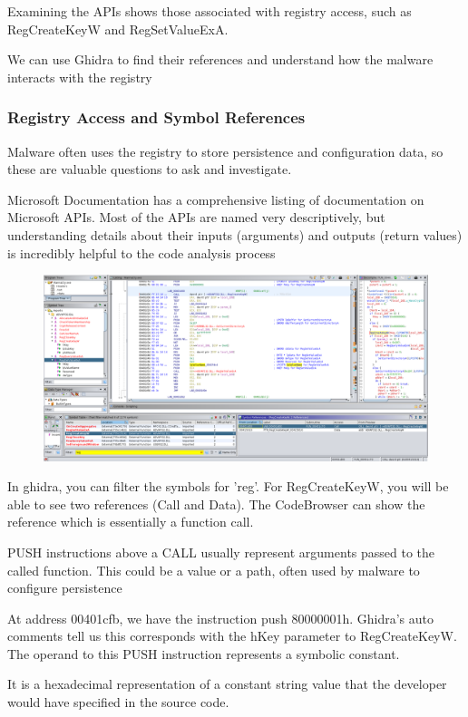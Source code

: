 \documentclass[]{project_plan}
\begin{document}
Examining the APIs shows those associated with registry access, such
as RegCreateKeyW and RegSetValueExA.

We can use Ghidra to find their references
and understand how the malware interacts with the registry


\subsubsection{Registry Access and Symbol References}
Malware often uses
the registry to store persistence and configuration data, so these are valuable
questions to ask and investigate.

Microsoft Documentation has a comprehensive listing of documentation on Microsoft APIs. Most of the APIs are named
very descriptively, but understanding details about their inputs (arguments)
and outputs (return values) is incredibly helpful to the code analysis process

\begin{figure}[H]
  \centering
  \includegraphics[width=\linewidth]{lab2 reg symb ref.png}
\end{figure}

In ghidra, you can filter the symbols for 'reg'. For RegCreateKeyW, you will
be able to see two references (Call and Data). The CodeBrowser can show the
reference  which is essentially a function call.

PUSH instructions above a CALL usually represent arguments
passed to the called function. This could be a value or a
path, often used by malware to configure persistence

At address 00401cfb, we have the instruction push 80000001h. Ghidra’s
auto comments tell us this corresponds with the hKey parameter to RegCreateKeyW.
The operand to this PUSH instruction represents a symbolic constant.

It is a hexadecimal representation of a constant string value that the developer would have
specified in the source code.
\end{document}
